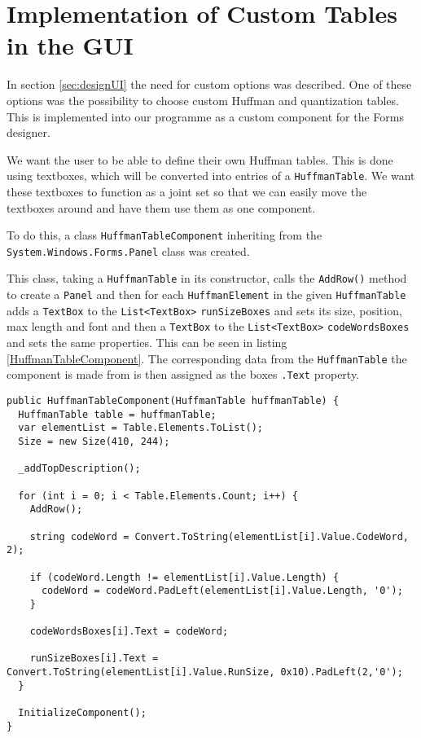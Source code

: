 \section{Implementation of Custom Tables in the GUI}
In section \ref{sec:designUI} the need for custom options was described. One of these options was the possibility to choose custom Huffman and quantization tables. This is implemented into our programme as a custom component for the Forms designer.

We want the user to be able to define their own Huffman tables. This is done using textboxes, which will be converted into entries of a \lstinline|HuffmanTable|. We want these textboxes to function as a joint set so that we can easily move the textboxes around and have them use them as one component.

To do this, a class \lstinline|HuffmanTableComponent| inheriting from the \lstinline|System.Windows.Forms.Panel| class was created. 

This class, taking a \lstinline|HuffmanTable| in its constructor, calls the \lstinline|AddRow()| method to create a \lstinline|Panel| and then for each \lstinline|HuffmanElement| in the given \lstinline|HuffmanTable| adds a \lstinline|TextBox| to the \lstinline|List<TextBox>| \lstinline|runSizeBoxes| and sets its size, position, max length and font and then a \lstinline|TextBox| to the \lstinline|List<TextBox>| \lstinline|codeWordsBoxes| and sets the same properties. This can be seen in listing \ref{HuffmanTableComponent}. The corresponding data from the \lstinline|HuffmanTable| the component is made from is then assigned as the boxes \lstinline|.Text| property.

\begin{lstlisting}[firstnumber=16,label=HuffmanTableComponent,caption={\lstinline|HuffmanTableComponent| constructor \textbf{File: }HuffmanTableComponent.cs}]
public HuffmanTableComponent(HuffmanTable huffmanTable) {
  HuffmanTable table = huffmanTable;
  var elementList = Table.Elements.ToList();
  Size = new Size(410, 244);
  
  _addTopDescription();
  
  for (int i = 0; i < Table.Elements.Count; i++) {
    AddRow();
    
    string codeWord = Convert.ToString(elementList[i].Value.CodeWord, 2);
    
    if (codeWord.Length != elementList[i].Value.Length) {
      codeWord = codeWord.PadLeft(elementList[i].Value.Length, '0');
    }
    
    codeWordsBoxes[i].Text = codeWord;
    
    runSizeBoxes[i].Text = Convert.ToString(elementList[i].Value.RunSize, 0x10).PadLeft(2,'0');
  }
  
  InitializeComponent(); 
}
\end{lstlisting}

